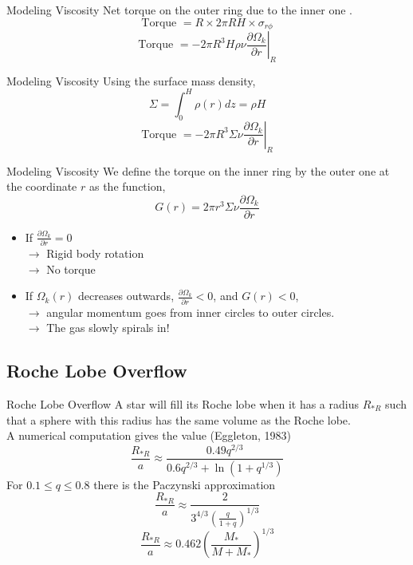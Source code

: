 \documentclass{beamer}
\begin{document}
\begin{frame}{Modeling Viscosity}
	Net torque on the outer ring due to the inner one	.
	\pause
	\[ \textrm{Torque } = R \times 2\pi R H \times \sigma_{r\phi} \] 
	\pause
	\[\textrm{Torque } = -2 \pi R^3 H \rho \nu  \left. \frac{\partial \Omega_k}{\partial r} \right|_R \]
\end{frame}

\begin{frame}{Modeling Viscosity}
	Using the surface mass density, 
	\pause
	\[ \Sigma = \int_0^H \rho(r) dz = \rho H \] 
	\pause
	\[\textrm{Torque } = -2 \pi R^3 \Sigma \nu  \left. \frac{\partial \Omega_k}{\partial r} \right|_R \]
\end{frame}


\begin{frame}{Modeling Viscosity}
	We define the torque on the inner ring by the outer one at the coordinate $r$ as the function, 
	\pause
	\[G(r) = 2 \pi r^3 \Sigma \nu \frac{\partial \Omega_k}{\partial r}\]
	\begin{itemize}
	\item If $\frac{\partial \Omega_k}{\partial r}=0$\\ 
	\pause
	$\rightarrow$ Rigid body rotation\\
	\pause
	$\rightarrow$ No torque
	\pause
	
	\item If $\Omega_k (r)$ decreases outwards, $\frac{\partial \Omega_k}{\partial r}<0$,
	\pause
	and $G(r)<0$, \\
	\pause
	$\rightarrow$ angular momentum goes from inner circles to outer circles.\\
	\pause
	$\rightarrow$ The gas slowly spirals in!
	\end{itemize}
\end{frame}

\subsection{Roche Lobe Overflow}
\begin{frame}{Roche Lobe Overflow}
	A star will fill its Roche lobe when it has a radius $R_{*R}$ such that a sphere with this radius has the same volume as the Roche lobe.\\
	
	\pause
	A numerical computation gives the value (Eggleton, 1983)
	\[ \frac{R_{*R}}{a} \approx \frac{0.49 q^{2/3}}{0.6 q^{2/3} + \ln \left( 1+ q^{1/3}\right)}\] 
	\pause
	For $0.1 \leq q \leq 0.8 $ there is the Paczynski approximation 
	\[ \frac{R_{*R}}{a} \approx \frac{2}{3^{4/3} \left( \frac{q}{1+ q}\right)^{1/3} }\] 
	\[ \frac{R_{*R}}{a} \approx 0.462 \left( \frac{M_*}{M + M_*} \right) ^{1/3}\]
\end{frame}
\end{document}
